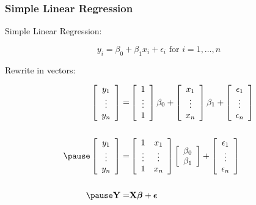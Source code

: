 \documentclass[]{beamer}
\begin{document}
\begin{frame} \frametitle{Simple Linear Regression}
Simple Linear Regression:

$$y_i = \beta_0 + \beta_1 x_i + \epsilon_i \text{  for  } i = 1,
\ldots, n$$  \pause
 
Rewrite in vectors:

\begin{eqnarray*}
  \left[
\begin{array}{c}  y_1 \\ \vdots \\  y_n \end{array} 
  \right]   =  & 
 \left[ \begin{array}{c}  1 \\ \vdots \\ 1 \end{array}  \right]   \beta_0 + 
 \left[ \begin{array}{c}  x_1 \\ \vdots \\  x_n \end{array}
 \right] \beta_1 + 
\left[ \begin{array}{c}  \epsilon_1 \\ \vdots \\ \epsilon_n  \end{array}
\right]
\\
 & \\ \pause
\left[
\begin{array}{c}  y_1 \\ \vdots \\  y_n \end{array} 
  \right]   =  & 
 \left[ \begin{array}{cc}  1 &  x_1 \\ \vdots & \vdots \\ 1 & x_n\end{array}  \right]   
 \left[ \begin{array}{c}  \beta_0  \\  \beta_1 \end{array}
 \right] + 
\left[ \begin{array}{c}  \epsilon_1 \\ \vdots \\ \epsilon_n  \end{array}
\right] \\
 & \\ \pause
\Y = & \X \b + \eps
\end{eqnarray*}
\end{frame}
\end{document}

